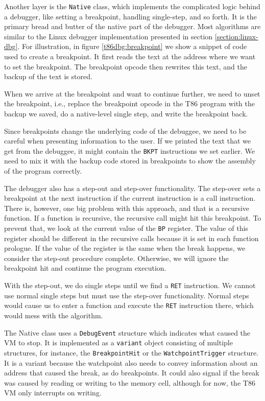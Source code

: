 Another layer is the \texttt{Native} class, which implements the complicated
logic behind a debugger, like setting a breakpoint, handling single-step, and
so forth. It is the primary bread and butter of the native part of the
debugger. Most algorithms are similar to the Linux debugger implementation
presented in section \ref{section:linux-dbg}. For illustration, in figure
\ref{t86dbg:breakpoint} we show a snippet of code used to create a breakpoint.
It first reads the text at the address where we want to set the breakpoint. The
breakpoint opcode then rewrites this text, and the backup of the text is
stored.

When we arrive at the breakpoint and want to continue further, we need to unset
the breakpoint, i.e., replace the breakpoint opcode in the T86 program with the
backup we saved, do a native-level single step, and write the breakpoint back.

Since breakpoints change the underlying code of the debuggee, we need to be
careful when presenting information to the user. If we printed the text that we
get from the debuggee, it might contain the \texttt{BKPT} instructions we set
earlier. We need to mix it with the backup code stored in breakpoints to show
the assembly of the program correctly.

The debugger also has a step-out and step-over functionality. The step-over
sets a breakpoint at the next instruction if the current instruction is a call
instruction. There is, however, one big problem with this approach, and that is
a recursive function. If a function is recursive, the recursive call might hit
this breakpoint. To prevent that, we look at the current value of the
\texttt{BP} register. The value of this register should be different in the
recursive calls because it is set in each function prologue. If the value of
the register is the same when the break happens, we consider the step-out
procedure complete. Otherwise, we will ignore the breakpoint hit and continue
the program execution.

With the step-out, we do single steps until we find a \texttt{RET} instruction.
We cannot use normal single steps but must use the step-over functionality.
Normal steps would cause us to enter a function and execute the \texttt{RET}
instruction there, which would mess with the algorithm.

The Native class uses a \texttt{DebugEvent} structure which indicates what
caused the VM to stop. It is implemented as a \texttt{variant} object
consisting of multiple structures, for instance, the \texttt{BreakpointHit} or
the \texttt{WatchpointTrigger} structure. It is a variant because the
watchpoint also needs to convey information about an address that caused the
break, as do breakpoints. It could also signal if the break was caused by
reading or writing to the memory cell, although for now, the T86 VM only
interrupts on writing.

